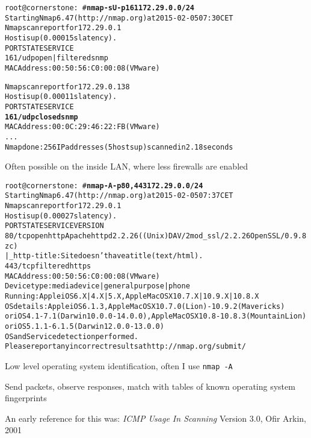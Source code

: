 \documentclass[Screen16to9,17pt]{foils}
\begin{document}
\begin{alltt}\small
root@cornerstone:~#{\bfseries nmap -sU -p 161 172.29.0.0/24}
Starting Nmap 6.47 ( http://nmap.org ) at 2015-02-05 07:30 CET
Nmap scan report for 172.29.0.1
Host is up (0.00015s latency).
PORT    STATE         SERVICE
{\color{darkgreen}161/udp open|filtered snmp}
MAC Address: 00:50:56:C0:00:08 (VMware)

Nmap scan report for 172.29.0.138
Host is up (0.00011s latency).
PORT    STATE  SERVICE
{\bf{161/udp closed snmp}}
MAC Address: 00:0C:29:46:22:FB (VMware)
...
Nmap done: 256 IP addresses (5 hosts up) scanned in 2.18 seconds
\end{alltt}

Often possible on the inside LAN, where less firewalls are enabled


\begin{alltt}\footnotesize
root@cornerstone:~#{\bfseries nmap -A -p80,443 172.29.0.0/24}
Starting Nmap 6.47 ( http://nmap.org ) at 2015-02-05 07:37 CET
Nmap scan report for 172.29.0.1
Host is up (0.00027s latency).
PORT    STATE    SERVICE VERSION
80/tcp  open     http    Apache httpd 2.2.26 ((Unix) DAV/2 mod_ssl/2.2.26 OpenSSL/0.9.8zc)
|_http-title: Site doesn't have a title (text/html).
443/tcp filtered https
MAC Address: 00:50:56:C0:00:08 (VMware)
Device type: media device|general purpose|phone
Running: Apple iOS 6.X|4.X|5.X, Apple Mac OS X 10.7.X|10.9.X|10.8.X
OS details: Apple iOS 6.1.3, Apple Mac OS X 10.7.0 (Lion) - 10.9.2 (Mavericks)
or iOS 4.1 - 7.1 (Darwin 10.0.0 - 14.0.0), Apple Mac OS X 10.8 - 10.8.3 (Mountain Lion)
or iOS 5.1.1 - 6.1.5 (Darwin 12.0.0 - 13.0.0)
OS and Service detection performed.
Please report any incorrect results at http://nmap.org/submit/
\end{alltt}

\begin{list2}
\item Low level operating system identification, often I use \verb+nmap -A+
\item Send packets, observe responses, match with tables of known operating system fingerprints
\item An early reference for this was: \emph{ICMP Usage In Scanning} Version 3.0,
  Ofir Arkin, 2001 %
\end{list2}


\end{document}
